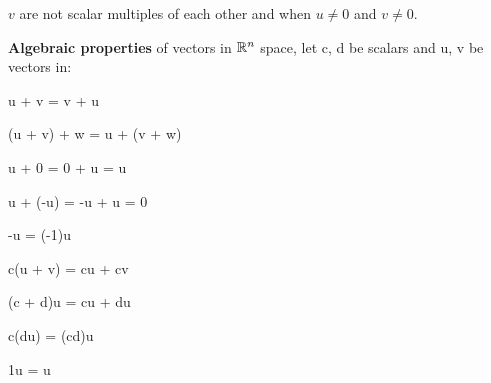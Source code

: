 \begin{card}
\begin{compactdesc}
        $v$ are not scalar multiples of each other and when $u \neq 0$ and
        $v \neq 0$.
    \end{compactdesc}
    \textbf{Algebraic properties} of vectors in $\mathbb{R}^n$ space, let
        c, d be scalars and u, v be vectors in:
        \begin{compactenum}
        \item u + v = v + u
        \item (u + v) + w = u + (v + w)
        \item u + 0 = 0 + u = u
        \item u + (-u) = -u + u = 0
        \item -u = (-1)u
        \item c(u + v) = cu + cv
        \item (c + d)u = cu + du
        \item c(du) = (cd)u
        \item 1u = u
        \end{compactenum}

\end{card}



